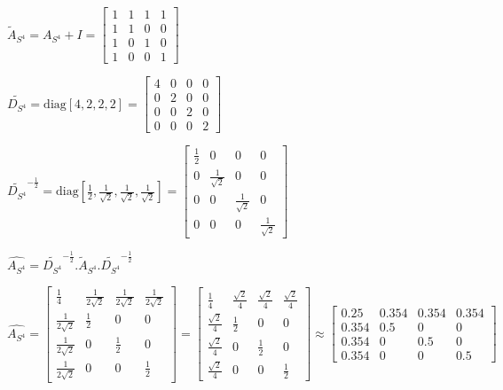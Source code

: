 \documentclass[a4paper]{article}
\begin{document}
$\tilde{A}_{S^4} = A_{S^4} + I = \begin{bmatrix}
    1  &  1  &  1  &  1 \\
    1  &  1  &  0  &  0 \\
    1  &  0  &  1  &  0 \\
    1  &  0  &  0  &  1 
  \end{bmatrix}
$

$ \tilde{D_{S^4}} = \text{diag}[4, 2, 2, 2] = \begin{bmatrix}
    4  &  0  &  0  &  0 \\
    0  &  2  &  0  &  0 \\
    0  &  0  &  2  &  0 \\
    0  &  0  &  0  &  2 
\end{bmatrix}$


$\tilde{D_{S^4}}^{-\frac{1}{2}} = \text{diag}[\frac{1}{2}, \frac{1}{\sqrt{2}}, \frac{1}{\sqrt{2}}, \frac{1}{\sqrt{2}}] = 
\begin{bmatrix}
    \frac{1}{2}  &  0  &  0  &  0 \\
    0  &  \frac{1}{\sqrt{2}}  &  0  &  0 \\
    0  &  0  &  \frac{1}{\sqrt{2}}  &  0 \\
    0  &  0  &  0  &  \frac{1}{\sqrt{2}} 
\end{bmatrix}$


$\hat{A_{S^4}} = \tilde{D_{S^4}}^{-\frac{1}{2}} .\tilde{A}_{S^4} .\tilde{D_{S^4}}^{-\frac{1}{2}} $





$\hat{A_{S^4}} = \begin{bmatrix}
    \frac{1}{4} &  \frac{1}{2\sqrt{2}}  &  \frac{1}{2\sqrt{2}}  &  \frac{1}{2\sqrt{2}} \\
    \frac{1}{2\sqrt{2}}  &  \frac{1}{2}  &  0 &  0\\
    \frac{1}{2\sqrt{2}}  &  0 &  \frac{1}{2}  &  0\\
    \frac{1}{2\sqrt{2}}  &  0 &  0 &  \frac{1}{2} 
\end{bmatrix} =
\left[\begin{matrix}\frac{1}{4} & \frac{\sqrt{2}}{4} & \frac{\sqrt{2}}{4} & \frac{\sqrt{2}}{4}\\\frac{\sqrt{2}}{4} & \frac{1}{2} & 0 & 0\\\frac{\sqrt{2}}{4} & 0 & \frac{1}{2} & 0\\\frac{\sqrt{2}}{4} & 0 & 0 & \frac{1}{2}\end{matrix}\right]
\approx \begin{bmatrix}
    0.25 &  0.354 &  0.354 &  0.354\\
    0.354 &  0.5 &  0 &  0\\
    0.354 &  0 &  0.5 &  0\\
    0.354 &  0 &  0 &  0.5
\end{bmatrix}
$
\end{document}
